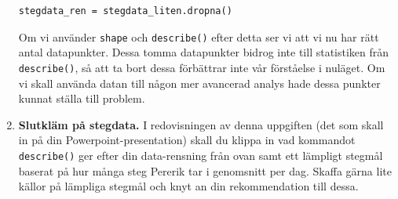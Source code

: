 \documentclass{article}
\begin{document}
\begin{enumerate}
\begin{verbatim}
stegdata_ren = stegdata_liten.dropna()
\end{verbatim}
Om vi använder \verb+shape+ och \verb+describe()+ efter detta ser vi att vi nu har rätt antal datapunkter. Dessa tomma datapunkter bidrog inte till statistiken från \verb+describe()+, så att ta bort dessa förbättrar inte vår förståelse i nuläget. Om vi skall använda datan till någon mer avancerad analys hade dessa punkter kunnat ställa till problem.
\item \textbf{Slutkläm på stegdata.} I redovisningen av denna uppgiften (det som skall in på din Powerpoint-presentation) skall du klippa in vad kommandot \verb+describe()+ ger efter din data-rensning från ovan samt ett lämpligt stegmål baserat på hur många steg Pererik tar i genomsnitt per dag. Skaffa gärna lite källor på lämpliga stegmål och knyt an din rekommendation till dessa.
\end{enumerate}
\end{document}
